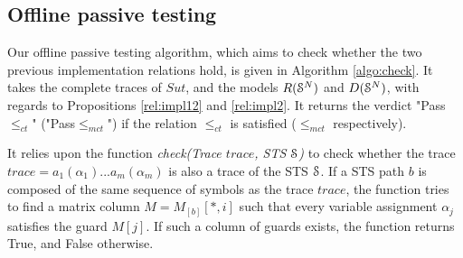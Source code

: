 \subsection{Offline passive testing}
\label{sec:testing:offline}

Our offline passive testing algorithm, which aims to check
whether the two previous implementation relations hold, is given
in Algorithm \ref{algo:check}. It takes the complete traces of
$\mathit{Sut}$, and the models $R(\EuScript{S}^{N})$ and
$D(\EuScript{S}^{N})$, with regards to Propositions
\ref{rel:impl12} and \ref{rel:impl2}. It returns the verdict
"Pass$\leq_{ct}$" ("Pass$\leq_{mct}$") if the relation
$\leq_{ct}$ is satisfied ($\leq_{mct}$ respectively).

It relies upon the function \textit{check(Trace $trace$, STS
$\EuScript{S}$)} to check whether the trace
$trace=a_1(\alpha_1)...a_m(\alpha_m)$ is also a trace of the STS
$\EuScript{S}$. If a STS path $b$ is composed of the same
sequence of symbols as the trace $trace$, the function tries to
find a matrix column  $M=M_{[b]}[*,i]$ such that every variable
assignment $\alpha_j$ satisfies the guard $M[j]$. If such a
column of guards exists, the function returns True, and False
otherwise.


